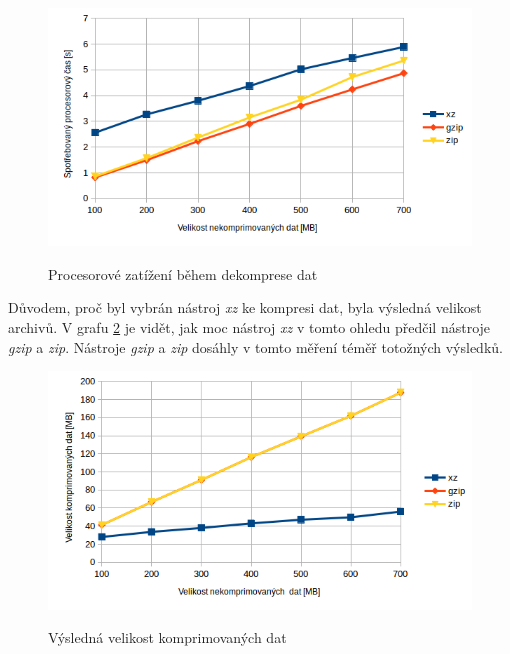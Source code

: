 \begin{figure}[H]
    \begin{center}
        \label{graph:dekomprese}
        \includegraphics[width=1.0\textwidth]{obrazky-figures/graph_dekomprese.png}
        \caption{Procesorové zatížení během dekomprese dat}
    \end{center}
\end{figure}

Důvodem, proč byl vybrán nástroj \textit{xz} ke kompresi dat, byla výsledná
velikost archivů. V grafu \ref{graph:vysledna_velikost} je vidět,
jak moc nástroj \textit{xz} v tomto ohledu předčil nástroje \textit{gzip} a \textit{zip}.
Nástroje \textit{gzip} a \textit{zip} dosáhly v tomto měření téměř totožných výsledků.

\begin{figure}[H]
    \begin{center}
        \label{graph:vysledna_velikost}
        \includegraphics[width=1.0\textwidth]{obrazky-figures/graph_vysledna_velikost.png}
        \caption{Výsledná velikost komprimovaných dat}
    \end{center}
\end{figure}

